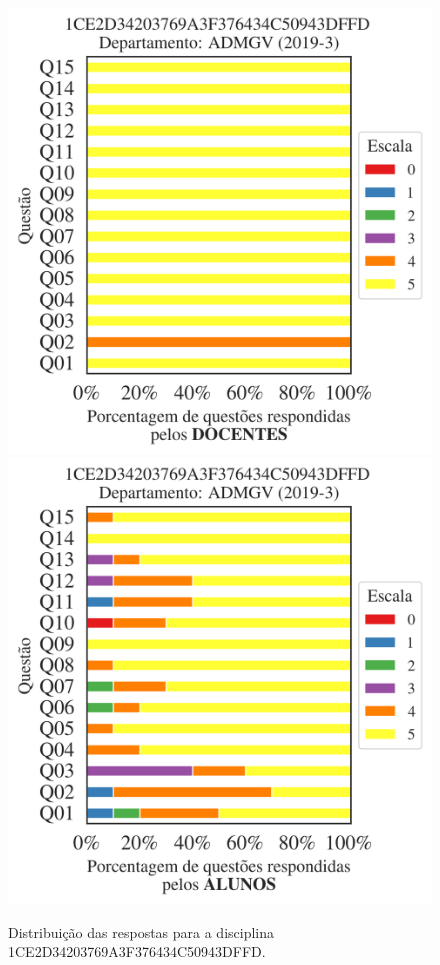 \documentclass[a4paper,10pt]{article}
\begin{document}
\begin{figure}[h]
\centering
\includegraphics[width=0.485\linewidth]{analise_disciplina_departamento_ADMGV_1CE2D34203769A3F376434C50943DFFD_docentes.png}
\includegraphics[width=0.485\linewidth]{analise_disciplina_departamento_ADMGV_1CE2D34203769A3F376434C50943DFFD_alunos.png}
\caption{\label{fig:analise_geral_departamento}                Distribuição das respostas para a disciplina 1CE2D34203769A3F376434C50943DFFD. }
\end{figure}
\end{document}
